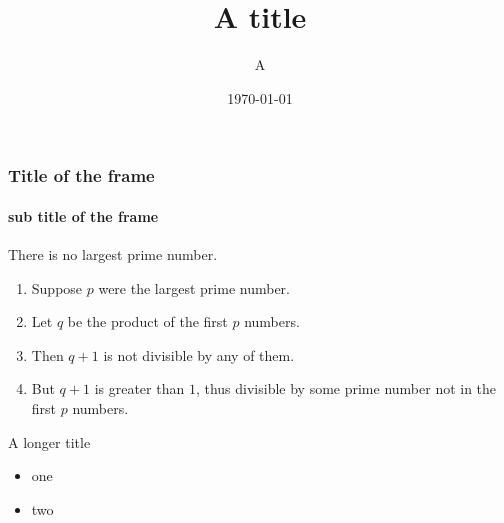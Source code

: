 \documentclass{beamer}
\title{A title}
\date{\today}
\author{A}
\institute{ABCD}
\begin{document}
\begin{frame}
 \titlepage
\end{frame}

\begin{frame}
  \frametitle{Title of the frame}
  \framesubtitle{sub title of the frame}

\begin{theorem}
There is no largest prime number. \end{theorem} 
\begin{enumerate} 
\item<1-| alert@1> Suppose $p$ were the largest prime number. 
\item<2-> Let $q$ be the product of the first $p$ numbers. 
\item<3-> Then $q+1$ is not divisible by any of them. 
\item<1-> But $q + 1$ is greater than $1$, thus divisible by some prime
number not in the first $p$ numbers.
\end{enumerate}
  \end{frame}

\begin{frame}{A longer title}
\begin{itemize}
\item one
\item two
\end{itemize}
\end{frame}


 
\end{document}
